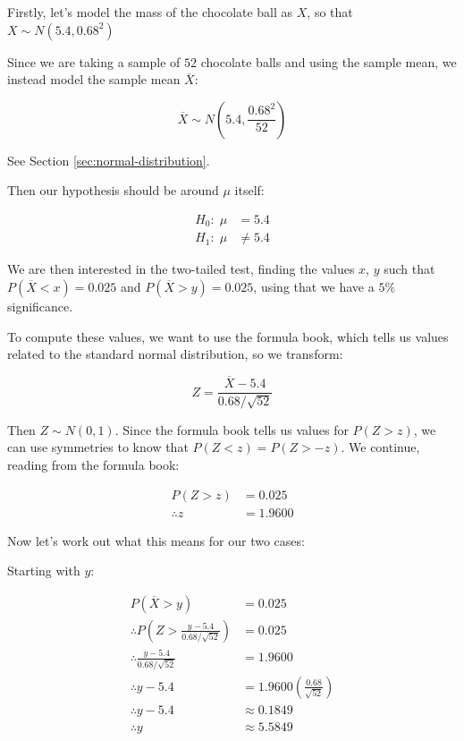  \begin{solution}
    Firstly, let's model the mass of the chocolate ball as $X$, so that $X \sim N(5.4,0.68^2)$

    Since we are taking a sample of $52$ chocolate balls and using the sample mean, we instead model the sample mean $\overline{X}$:

    \[
    \overline{X}\sim N\!\left(5.4,\frac{0.68^2}{52}\right)
    \]

    See Section \ref{sec:normal-distribution}.

    Then our hypothesis should be around $\mu$ itself:

    \begin{align*}
        H_0 :\; \mu &= 5.4 \\
        H_1 :\; \mu &\neq 5.4
    \end{align*}

    We are then interested in the two-tailed test, finding the values $x$, $y$ such that 
    $P(\overline{X}< x)= 0.025$ and $P(\overline{X}>y)=0.025$, using that we have a $5\%$ significance.

    To compute these values, we want to use the formula book, which tells us values related to the standard normal distribution, so we transform:

    \[
    Z = \frac{\overline{X} - 5.4}{0.68/\sqrt{52}}
    \]

    Then $Z\sim N(0,1)$. Since the formula book tells us values for $P(Z>z)$, we can use symmetries to know that $P(Z<z) = P(Z>-z)$. We continue, reading from the formula book:

    \begin{align*} 
        P(Z>z) &= 0.025 \\
        \therefore z &= 1.9600
    \end{align*}

    Now let's work out what this means for our two cases:

    Starting with $y$:

    \begin{align*}
        P(\overline{X}>y)&=0.025 \\
        \therefore P\!\left(Z> \frac{y - 5.4}{0.68/\sqrt{52}}\right) &= 0.025 \\
        \therefore \frac{y - 5.4}{0.68/\sqrt{52}} &= 1.9600 \\
        \therefore y - 5.4 &= 1.9600\left(\frac{0.68}{\sqrt{52}}\right) \\
        \therefore y - 5.4 &\approx 0.1849 \\
        \therefore y &\approx 5.5849
    \end{align*}


\end{solution}

